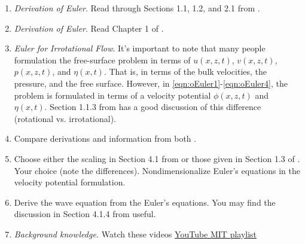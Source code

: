 \documentclass[a4paper,reqno]{article}
\begin{document}
\begin{itemize}
\begin{enumerate}
                \item \emph{Derivation of Euler}. Read through Sections 1.1, 1.2, and 2.1 from \cite{chorin1990mathematical}.   
                \item \emph{Derivation of Euler}. Read Chapter 1 of \cite{johnson1997modern}.
                \item \emph{Euler for Irrotational Flow}.  It's important to note that many people formulation the free-surface problem in terms of $u(x,z,t)$, $v(x,z,t)$, $p(x,z,t)$, and $\eta(x,t)$.  That is, in terms of the bulk velocities, the pressure, and the free surface.  However, in \eqref{eqn:oEuler1}-\eqref{eqn:oEuler4}, the problem is formulated in terms of a velocity potential $\phi(x,z,t)$ and $\eta(x,t)$.  Section 1.1.3 from \cite{johnson1997modern} has a good discussion of this difference (rotational vs. irrotational).
                \item Compare derivations and information from both \cite{chorin1990mathematical,johnson1997modern}.
                \item Choose either the scaling in Section 4.1 from \cite{deconinckNotes} or those given in Section 1.3 of \cite{johnson1997modern}.  Your choice (note the differences).  Nondimensionalize Euler's equations in the velocity potential formulation.
                \item Derive the wave equation from the Euler's equations.  You may find the discussion in Section 4.1.4 from \cite{deconinckNotes} useful.
                \item \emph{Background knowledge.} Watch these videos \href{https://www.youtube.com/playlist?list=PLfF--3o8i4r82vJ0kjCVYgqKgyVM5QwN0}{YouTube MIT playlist}
            \end{enumerate}
    \end{itemize}



\end{document}
